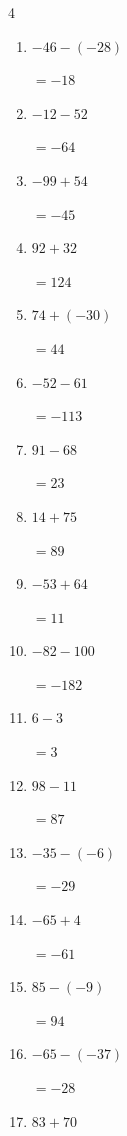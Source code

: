 \begin{multicols}{4}
\begin{enumerate}
        $=51$

  \item $-46-(-28)$

        $=-18$

  \item $-12-52$

        $=-64$

  \item $-99+54$

        $=-45$

  \item $92+32$

        $=124$

  \item $74+(-30)$

        $=44$

  \item $-52-61$

        $=-113$

  \item $91-68$

        $=23$

  \item $14+75$

        $=89$

  \item $-53+64$

        $=11$

  \item $-82-100$

        $=-182$

  \item $6-3$

        $=3$

\columnbreak %

  \item $98-11$

        $=87$

  \item $-35-(-6)$

        $=-29$

  \item $-65+4$

        $=-61$

  \item $85-(-9)$

        $=94$

  \item $-65-(-37)$

        $=-28$

  \item $83+70$


\end{enumerate}
\end{multicols}
